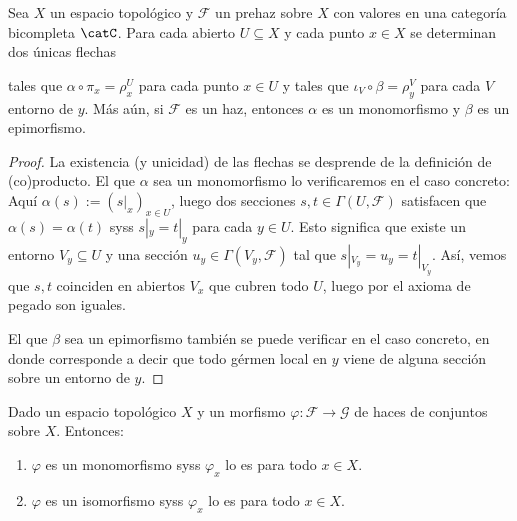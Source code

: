 \begin{prop}
	Sea $X$ un espacio topológico y $\mathscr{F}$ un prehaz sobre $X$ con valores en una categoría bicompleta $\catC$.
	Para cada abierto $U \subseteq X$ y cada punto $x \in X$ se determinan dos únicas flechas
	\begin{center}
	\end{center}
	tales que $\alpha\circ\pi_x = \rho^U_x$ para cada punto $x \in U$ y tales que $\iota_V \circ \beta = \rho^V_y$ para cada $V$ entorno de $y$.
	Más aún, si $\mathscr{F}$ es un haz, entonces $\alpha$ es un monomorfismo y $\beta$ es un epimorfismo.
\end{prop}
\begin{proof}
	La existencia (y unicidad) de las flechas se desprende de la definición de (co)producto.
	El que $\alpha$ sea un monomorfismo lo verificaremos en el caso concreto: Aquí $\alpha(s) := (s|_x)_{x\in U}$,
	luego dos secciones $s, t \in \Gamma(U, \mathscr{F})$ satisfacen que $\alpha(s) = \alpha(t)$ syss $s|_y = t|_y$ para cada $y \in U$.
	Esto significa que existe un entorno $V_y \subseteq U$ y una sección $u_y \in \Gamma(V_y, \mathscr{F})$ tal que $s|_{V_y} = u_y = t|_{V_y}$.
	Así, vemos que $s, t$ coinciden en abiertos $V_x$ que cubren todo $U$, luego por el axioma de pegado son iguales.

	El que $\beta$ sea un epimorfismo también se puede verificar en el caso concreto, en donde corresponde a decir que todo gérmen local en $y$ viene
	de alguna sección sobre un entorno de $y$.
\end{proof}
\begin{prop}
	Dado un espacio topológico $X$ y un morfismo $\varphi \colon \mathscr{F} \to \mathscr{G}$ de haces de conjuntos sobre $X$. Entonces:
	\begin{enumerate}
		\item $\varphi$ es un monomorfismo syss $\varphi_x$ lo es para todo $x \in X$.
		\item $\varphi$ es un isomorfismo syss $\varphi_x$ lo es para todo $x \in X$.
	\end{enumerate}
\end{prop}
